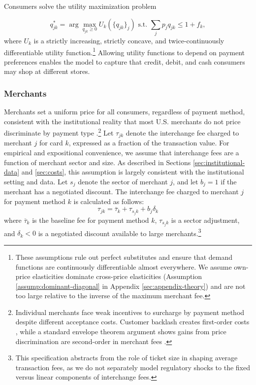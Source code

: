 \documentclass[main.tex]{subfiles}
\begin{document}
Consumers solve the utility maximization problem

\[q^{*}_{jk} = \arg\max_{q_{jk}\geq 0} U_k\left(\{q_{jk}\}_{j}\right) \text{ s.t. } \sum_j p_j q_{jk} \leq 1 + f_k,\]
where $U_k$ is a strictly increasing, strictly concave, and twice-continuously differentiable utility function.\footnote{ These assumptions rule out perfect substitutes and ensure that demand functions are continuously differentiable almost everywhere.
We assume own-price elasticities dominate cross-price elasticities (Assumption \ref{assump:dominant-diagonal} in Appendix \ref{sec:appendix-theory}) and are not too large relative to the inverse of the maximum merchant fee. } Allowing utility functions to depend on payment preferences enables the model to capture that credit, debit, and cash consumers may shop at different stores.

\subsubsection{Merchants}

Merchants set a uniform price for all consumers, regardless of payment method, consistent with the institutional reality that most U.S. merchants do not price discriminate by payment type \citep{Stavins2018}.\footnote{Individual merchants face weak incentives to surcharge by payment method despite different acceptance costs.
Customer backlash creates first-order costs \citep{Stavins2018,Caddy.etal2020}, while a standard envelope theorem argument shows gains from price discrimination are second-order in merchant fees \citep{Wang2025}.}
Let $\tau_{jk}$ denote the interchange fee charged to merchant $j$ for card $k$, expressed as a fraction of the transaction value. For empirical and expositional convenience, we assume that interchange fees are a function of merchant sector and size. As described in Sections \ref{sec:institutional-data} and \ref{sec:costs}, this assumption is largely consistent with the institutional setting and data.
Let $s_j$ denote the sector of merchant $j$, and let $b_j = 1$ if the merchant has a negotiated discount. The interchange fee charged to merchant $j$ for payment method $k$ is calculated as follows:
\begin{equation}
\tau_{jk}=\overline{\tau}_{k}+\tau_{s_{j}k}+b_{j}\delta_{k}\label{eq:interchange-fee-model}
\end{equation}
where $\overline{\tau}_{k}$ is the baseline fee for payment method $k$, $\tau_{s_{j}k}$ is a sector adjustment, and $\delta_{k}<0$ is a negotiated discount available to large merchants.\footnote{This specification abstracts from the role of ticket size in shaping average transaction fees, as we do not separately model regulatory shocks to the fixed versus linear components of interchange fees.}
\end{document}
